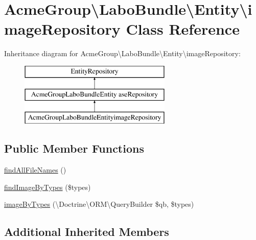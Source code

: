 \hypertarget{class_acme_group_1_1_labo_bundle_1_1_entity_1_1image_repository}{\section{Acme\+Group\textbackslash{}Labo\+Bundle\textbackslash{}Entity\textbackslash{}image\+Repository Class Reference}
\label{class_acme_group_1_1_labo_bundle_1_1_entity_1_1image_repository}
}
Inheritance diagram for Acme\+Group\textbackslash{}Labo\+Bundle\textbackslash{}Entity\textbackslash{}image\+Repository\+:\begin{figure}[H]
\begin{center}
\leavevmode
\includegraphics[height=3.000000cm]{class_acme_group_1_1_labo_bundle_1_1_entity_1_1image_repository}
\end{center}
\end{figure}
\subsection*{Public Member Functions}
\begin{DoxyCompactItemize}
\item 
\hyperlink{class_acme_group_1_1_labo_bundle_1_1_entity_1_1image_repository_a5137f38d3547ecef28cfe83892cb12e1}{find\+All\+File\+Names} ()
\item 
\hyperlink{class_acme_group_1_1_labo_bundle_1_1_entity_1_1image_repository_a593a089df37f9fdcfa8f000ae965b40d}{find\+Image\+By\+Types} (\$types)
\item 
\hyperlink{class_acme_group_1_1_labo_bundle_1_1_entity_1_1image_repository_a3d551e4ae0816776110bf11204cd5e50}{image\+By\+Types} (\textbackslash{}Doctrine\textbackslash{}\+O\+R\+M\textbackslash{}\+Query\+Builder \$qb, \$types)
\end{DoxyCompactItemize}
\subsection*{Additional Inherited Members}


